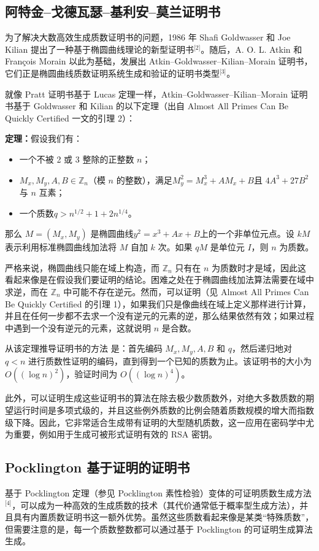 \subsection{阿特金–戈德瓦瑟–基利安–莫兰证明书}
为了解决大数高效生成质数证明书的问题，1986 年 Shafi Goldwasser 和 Joe Kilian 提出了一种基于椭圆曲线理论的新型证明书\(^\text{[2]}\)。随后，A. O. L. Atkin 和 François Morain 以此为基础，发展出 Atkin–Goldwasser–Kilian–Morain 证明书，它们正是椭圆曲线质数证明系统生成和验证的证明书类型\(^\text{[3]}\)。

就像 Pratt 证明书基于 Lucas 定理一样，Atkin–Goldwasser–Kilian–Morain 证明书基于 Goldwasser 和 Kilian 的以下定理（出自 Almost All Primes Can Be Quickly Certified 一文的引理 2）：

\textbf{定理：}假设我们有：
\begin{itemize}
\item 一个不被 2 或 3 整除的正整数 $n$；
\item $M_x, M_y, A, B \in \mathbb{Z}_n$（模 $n$ 的整数），满足$M_y^2 = M_x^3 + A M_x + B$且 $4A^3 + 27B^2$ 与 $n$ 互素；
\item 一个质数$q > n^{1/2} + 1 + 2n^{1/4}$。
\end{itemize}
那么 $M = (M_x, M_y)$ 是椭圆曲线$y^2 = x^3 + A x + B$上的一个非单位元点。设 $kM$ 表示利用标准椭圆曲线加法将 $M$ 自加 $k$ 次。如果 $qM$ 是单位元 $I$，则 $n$ 为质数。

严格来说，椭圆曲线只能在域上构造，而 $\mathbb{Z}_n$ 只有在 $n$ 为质数时才是域，因此这看起来像是在假设我们要证明的结论。困难之处在于椭圆曲线加法算法需要在域中求逆，而在 $\mathbb{Z}_n$ 中可能不存在逆元。然而，可以证明（见 Almost All Primes Can Be Quickly Certified 的引理 1），如果我们只是像曲线在域上定义那样进行计算，并且在任何一步都不去求一个没有逆元的元素的逆，那么结果依然有效；如果过程中遇到一个没有逆元的元素，这就说明 $n$ 是合数。

从该定理推导证明书的方法 是：首先编码 $M_x, M_y, A, B$ 和 $q$，然后递归地对 $q < n$ 进行质数性证明的编码，直到得到一个已知的质数为止。该证明书的大小为 $O((\log n)^2)$，验证时间为 $O((\log n)^4)$。

此外，可以证明生成这些证明书的算法在除去极少数质数外，对绝大多数质数的期望运行时间是多项式级的，并且这些例外质数的比例会随着质数规模的增大而指数级下降。因此，它非常适合生成带有证明的大型随机质数，这一应用在密码学中尤为重要，例如用于生成可被形式证明有效的 RSA 密钥。
\subsection{Pocklington 基于证明的证明书}
基于 Pocklington 定理（参见 Pocklington 素性检验）变体的可证明质数生成方法\(^\text{[4]}\)，可以成为一种高效的生成质数的技术（其代价通常低于概率型生成方法），并且具有内置质数证明书这一额外优势。虽然这些质数看起来像是某类“特殊质数”，但需要注意的是，每一个质数整数都可以通过基于 Pocklington 的可证明生成算法生成。
